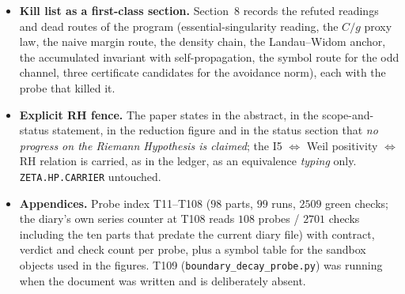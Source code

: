 \documentclass[11pt]{article}
\begin{document}
\begin{itemize}[leftmargin=1.5em]
per-section provenance marker; every quantitative statement carries its probe label (T$n$) and is
reproduced verbatim from the research diary. All measured quantities are declared as measured, all
window results as window results, all hypothesis inputs as hypothesis inputs.
\item \textbf{Kill list as a first-class section.} Section~8 records the refuted readings and dead
routes of the program (essential-singularity reading, the $C/g$ proxy law, the naive margin route, the
density chain, the Landau--Widom anchor, the accumulated invariant with self-propagation, the symbol
route for the odd channel, three certificate candidates for the avoidance norm), each with the probe
that killed it.
\item \textbf{Explicit RH fence.} The paper states in the abstract, in the scope-and-status statement, in the
reduction figure and in the status section that \emph{no progress on the Riemann Hypothesis is claimed};
the I5 $\Leftrightarrow$ Weil positivity $\Leftrightarrow$ RH relation is carried, as in the ledger, as an
equivalence \emph{typing} only. \texttt{ZETA.HP.CARRIER} untouched.
\item \textbf{Appendices.} Probe index T11--T108 ($98$ parts, $99$ runs, $2509$ green checks; the
diary's own series counter at T108 reads $108$ probes / $2701$ checks including the ten parts that
predate the current diary file) with contract, verdict and check count per probe, plus a symbol table
for the sandbox objects used in the figures. T109 (\texttt{boundary\_decay\_probe.py}) was running when
the document was written and is deliberately absent.
\end{itemize}
\end{document}
